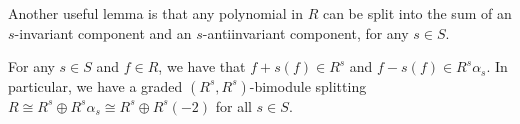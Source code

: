 
\noindent Another useful lemma is that any polynomial in $R$ can be split into the sum of an $s$-invariant component and an $s$-antiinvariant component, for any $s \in S$.\\

\noindent\begin{lemma}\label{RSplitting} For any $s \in S$ and $f \in R$, we have that $f + s(f) \in R^s$ and $f - s(f) \in R^s\alpha_s$. In particular, we have a graded $(R^s, R^s)$-bimodule splitting $R \cong R^s \oplus R^s\alpha_s \cong R^s \oplus R^s(-2)$ for all $s \in S$.\\
\end{lemma}

